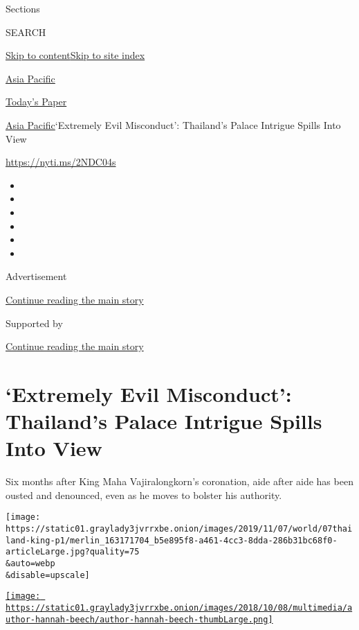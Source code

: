 Sections

SEARCH

\protect\hyperlink{site-content}{Skip to
content}\protect\hyperlink{site-index}{Skip to site index}

\href{https://www.nytimes3xbfgragh.onion/section/world/asia}{Asia
Pacific}

\href{https://myaccount.nytimes3xbfgragh.onion/auth/login?response_type=cookie\&client_id=vi}{}

\href{https://www.nytimes3xbfgragh.onion/section/todayspaper}{Today's
Paper}

\href{/section/world/asia}{Asia Pacific}\textbar{}`Extremely Evil
Misconduct': Thailand's Palace Intrigue Spills Into View

\url{https://nyti.ms/2NDC04s}

\begin{itemize}
\item
\item
\item
\item
\item
\item
\end{itemize}

Advertisement

\protect\hyperlink{after-top}{Continue reading the main story}

Supported by

\protect\hyperlink{after-sponsor}{Continue reading the main story}

\hypertarget{extremely-evil-misconduct-thailands-palace-intrigue-spills-into-view}{%
\section{`Extremely Evil Misconduct': Thailand's Palace Intrigue Spills
Into
View}\label{extremely-evil-misconduct-thailands-palace-intrigue-spills-into-view}}

Six months after King Maha Vajiralongkorn's coronation, aide after aide
has been ousted and denounced, even as he moves to bolster his
authority.

\texttt{[image: https://static01.graylady3jvrrxbe.onion/images/2019/11/07/world/07thailand-king-p1/merlin\_163171704\_b5e895f8-a461-4cc3-8dda-286b31bc68f0-articleLarge.jpg?quality=75\\\&auto=webp\\\&disable=upscale]}

\href{https://www.nytimes3xbfgragh.onion/by/hannah-beech}{\texttt{[image: https://static01.graylady3jvrrxbe.onion/images/2018/10/08/multimedia/author-hannah-beech/author-hannah-beech-thumbLarge.png]}}

